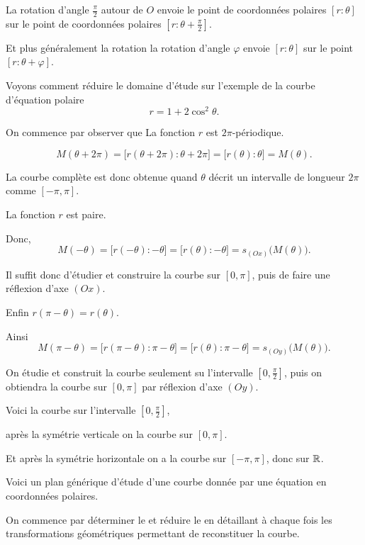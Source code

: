 \change
La rotation d'angle $\frac{\pi}{2}$ autour de $O$ envoie 
le point de coordonnées polaires $[r:\theta]$ sur le point 
de coordonnées polaires $[r:\theta+\frac{\pi}{2}]$.

Et plus généralement la rotation la rotation d'angle $\varphi$ 
envoie $[r:\theta]$ sur le point $[r:\theta+\varphi]$.




\diapo

Voyons comment réduire le domaine d'étude sur l'exemple de la 
courbe d'équation polaire 
$$r=1+2\cos^2\theta.$$

\change

On commence par observer que 
La fonction $r$ est $2\pi$-périodique. 

\change
$$M(\theta+2\pi)=\big[r(\theta+2\pi):\theta+2\pi\big]=\big[r(\theta):\theta\big]=M(\theta).$$

\change
La courbe complète est donc obtenue quand $\theta$ décrit un 
intervalle de longueur $2\pi$ comme $[-\pi,\pi]$. 

\change
La fonction $r$ est paire. 

\change
Donc, 
$$M(-\theta)=\big[r(-\theta):-\theta\big]=\big[r(\theta):-\theta\big]=s_{(Ox)}\big(M(\theta)\big).$$

\change
Il suffit donc d'étudier et construire la courbe sur $[0,\pi]$, 
puis de faire une réflexion d'axe $(Ox)$.


\change
Enfin 
$r(\pi-\theta)=r(\theta)$. 


\change
Ainsi 
$$M(\pi-\theta)=\big[r(\pi-\theta):\pi-\theta\big]=\big[r(\theta):\pi-\theta\big]=s_{(Oy)}\big(M(\theta)\big).$$

\change
On étudie et construit la courbe seulement su l'intervalle $[0,\frac{\pi}{2}]$, 
puis on obtiendra la courbe sur $[0,\pi]$ par réflexion d'axe $(Oy)$. 


\change
Voici la courbe sur l'intervalle $[0,\frac{\pi}{2}]$,

\change
après la symétrie verticale on la courbe sur $[0,\pi]$.

\change
Et après la symétrie horizontale on a la courbe sur $[-\pi,\pi]$, donc sur $\mathbb{R}$.


\diapo

Voici un plan générique d'étude d'une courbe donnée par une équation en coordonnées polaires.
  
On commence par  déterminer le  et réduire le  
en détaillant à chaque fois les transformations géométriques permettant de reconstituer la courbe.

